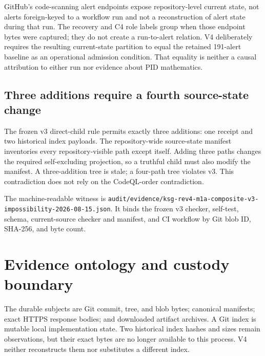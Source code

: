 \documentclass[11pt,a4paper]{article}
\begin{document}
GitHub's code-scanning alert endpoints expose repository-level current state, not alerts
foreign-keyed to a workflow run and not a reconstruction of alert state during that run. The
recovery and C4 role labels group when those endpoint bytes were captured; they do not create a
run-to-alert relation. V4 deliberately requires the resulting current-state partition to equal the
retained 191-alert baseline as an operational admission condition. That equality is neither a
causal attribution to either run nor evidence about PID mathematics.

\subsection{Three additions require a fourth source-state change}

The frozen v3 direct-child rule permits exactly three additions: one receipt and two historical
index payloads. The repository-wide source-state manifest inventories every repository-visible
path except itself. Adding three paths changes the required self-excluding projection, so a truthful
child must also modify the manifest. A three-addition tree is stale; a four-path tree violates v3.
This contradiction does not rely on the CodeQL-order contradiction.

The machine-readable witness is
\nolinkurl{audit/evidence/ksg-rev4-m1a-composite-v3-impossibility-2026-08-15.json}.
It binds the frozen v3 checker, self-test, schema, current-source checker and manifest, and CI
workflow by Git blob ID, SHA-256, and byte count.

\section{Evidence ontology and custody boundary}

The durable subjects are Git commit, tree, and blob bytes; canonical manifests; exact HTTPS
response bodies; and downloaded artifact archives. A Git index is mutable local implementation
state. Two historical index hashes and sizes remain observations, but their exact bytes are no
longer available to this process. V4 neither reconstructs them nor substitutes a different index.
\end{document}
